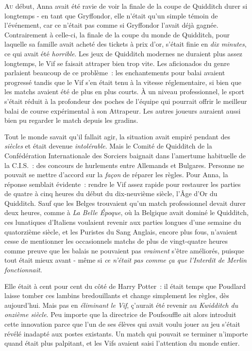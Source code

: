 
\lettrine{A}{u} début, Anna avait été ravie de voir la finale de la coupe de Quidditch durer si longtemps - en tant que Gryffondor, elle n'était qu'un simple témoin de l'événement, car ce n'était pas comme si Gryffondor l'avait déjà gagnée. Contrairement à celle-ci, la finale de la coupe du monde de Quidditch, pour laquelle sa famille avait acheté des tickets à prix d'or, s'était finie en \emph{dix minutes}, ce qui avait été \emph{horrible}. Les jeux de Quidditch modernes ne duraient plus assez longtemps, le Vif se faisait attraper bien trop vite. Les aficionados du genre parlaient beaucoup de ce problème~: les enchantements pour balai avaient progressé tandis que le Vif s'en était tenu à la vitesse réglementaire, si bien que les matchs avaient été de plus en plus courts. À un niveau professionnel, le sport s'était réduit à la profondeur des poches de l'équipe qui pourrait offrir le meilleur balai de course expérimental à son Attrapeur. Les autres joueurs auraient aussi bien pu regarder le match depuis les gradins.

Tout le monde savait qu'il fallait agir, la situation avait empiré pendant des \emph{siècles} et était devenue \emph{intolérable}. Mais le Comité de Quidditch de la Confédération Internationale des Sorciers baignait dans l'amertume habituelle de la C.I.S.~: des concours de hurlements entre Allemands et Bulgares. Personne ne pouvait se mettre d'accord sur la \emph{façon} de réparer les règles. Pour Anna, la réponse semblait évidente~: rendre le Vif assez rapide pour restaurer les parties de quatre à cinq heures du début du dix-neuvième siècle, l'Âge d'Or du Quidditch. Sauf que les Belges trouvaient qu'un match professionnel devait durer deux heures, comme à \emph{La Belle Époque}, où la Belgique avait dominé le Quidditch, ces lunatiques d'Italiens voulaient revenir aux parties longues d'une semaine du quatorzième siècle, et les Puristes du Sang Anglais, encore plus fous, n'avaient cesse de mentionner les occasionnels matchs de plus de vingt-quatre heures comme preuve que les balais ne pouvaient pas \emph{vraiment} s'être améliorés, puisque tout était mieux avant - même si \emph{ce n'était pas comme ça que l'Interdit de Merlin fonctionnait}.

Elle était à cent pour cent du côté de Harry Potter~: il était temps que Poudlard laisse tomber ces lambins bredouillants et change simplement les règles, dès aujourd'hui. Mais pas en \emph{éliminant le Vif}, ç'aurait été revenir au \emph{Kwidditch du onzième siècle}. Peu importe que la directrice de Poufsouffle ait alors introduit cette innovation parce que l'un de ses élèves qui avait voulu jouer au jeu s'était révélé inadapté aux postes existants. Un match qui pouvait se terminer n'importe quand était plus palpitant, et les Vifs avaient saisi l'attention du monde entier.

